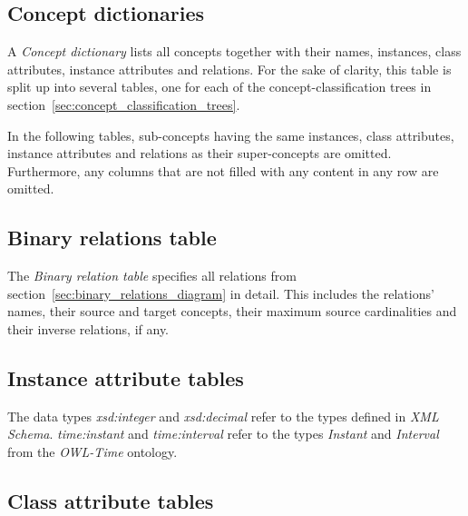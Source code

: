 \subsection{Concept dictionaries}
\label{subsec:concept_dictionaries}

A \emph{Concept dictionary} lists all concepts together with their names, instances, class attributes, instance attributes and relations. For the sake of clarity, this table is split up into several tables, one for each of the concept-classification trees in section~\ref{sec:concept_classification_trees}.

In the following tables, sub-concepts having the same instances, class attributes, instance attributes and relations as their super-concepts are omitted. Furthermore, any columns that are not filled with any content in any row are omitted.


\subsection{Binary relations table}
\label{subsec:binary_relations_table}

The \emph{Binary relation table} specifies all relations from section~\ref{sec:binary_relations_diagram} in detail. This includes the relations' names, their source and target concepts, their maximum source cardinalities and their inverse relations, if any.


\subsection{Instance attribute tables}
\label{subsec:instance_attribute_tables}



The data types \emph{xsd:integer} and \emph{xsd:decimal} refer to the types defined in \emph{XML Schema}\cite{xml-schema-datatypes}. \emph{time:instant} and \emph{time:interval} refer to the types \emph{Instant} and \emph{Interval} from the \emph{OWL-Time}  ontology\cite{owl-time}.


\subsection{Class attribute tables}
\label{subsec:class_attribute_tables}

